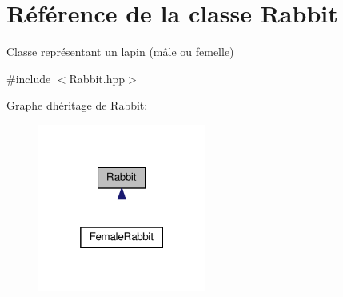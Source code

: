 \hypertarget{classRabbit}{}\section{Référence de la classe Rabbit}
\label{classRabbit}


Classe représentant un lapin (mâle ou femelle)  




{\ttfamily \#include $<$Rabbit.\+hpp$>$}



Graphe d\textquotesingle{}héritage de Rabbit\+:
\nopagebreak
\begin{figure}[H]
\begin{center}
\leavevmode
\includegraphics[width=157pt]{classRabbit__inherit__graph}
\end{center}
\end{figure}
